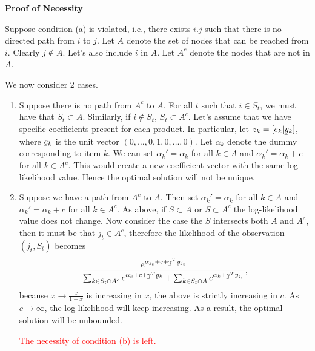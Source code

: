 \documentclass[11pt]{article}
\newcommand{\ubar}[1]{\underaccent{\bar}{#1}}
\begin{document}
{\bf Proof of Necessity}

Suppose condition (a) is violated, i.e., there exists $i.j$ such that there is no directed path from $i$ to $j$. Let $A$ denote the set of nodes that can be reached from $i$. Clearly $j\notin A$. Let's also include $i$ in $A$. Let $A^c$ denote the nodes that are not in $A$.
 
We now consider 2 cases.
\begin{enumerate}
\item Suppose there is no path from $A^c$ to $A$. For all $t$ such that $i \in S_t$, we must have that $S_t\subset A$. Similarly, if $i \notin S_t$, $S_t\subset A^c$. Let's assume that we have specific coefficients present for each product. In particular, let $\ubar z_k=[\ubar e_k | \ubar y_k]$, where $\ubar e_k$ is the unit vector $(0,\ldots,0,1,0,\ldots,0)$. Let $\alpha_k$ denote the dummy corresponding to item $k$. We can set $\alpha_k'=\alpha_k$ for all $k\in A$ and $\alpha_k'=\alpha_k+c$ for all $k\in A^c$. This would create a new coefficient vector with the same log-likelihood value. Hence the optimal solution will not be unique.

\item Suppose we have a path from $A^c$ to $A$. Then set $\alpha_k'=\alpha_k$ for all $k\in A$ and $\alpha_k'=\alpha_k+c$ for all $k\in A^c$. As above, if $S\subset A$ or $S\subset A^c$ the log-likelihood value does not change. Now consider the case the $S$ intersects both $A$ and $A^c$, then it must be that $j_t\in A^c$, therefore the likelihood of the observation $(j_t,S_t)$ becomes
$$\frac{e^{\alpha_{j_t}+c+\ubar \gamma^T \ubar y_{j_t}}}{\sum_{k\in S_t\cap A^c} e^{\alpha_k+c+\ubar \gamma^T\ubar y_k}+\sum_{k\in S_t\cap A}e^{\alpha_k+\ubar \gamma^Ty_{j_t}}},$$
because $x\rightarrow \frac{x}{1+x}$ is increasing in $x$, the above is strictly increasing in $c$. As $c\rightarrow \infty$, the log-likelihood will keep increasing. As a result, the optimal solution will be unbounded.


\textcolor{red}{The necessity of condition (b) is left.}
\end{enumerate} 
\end{document}
